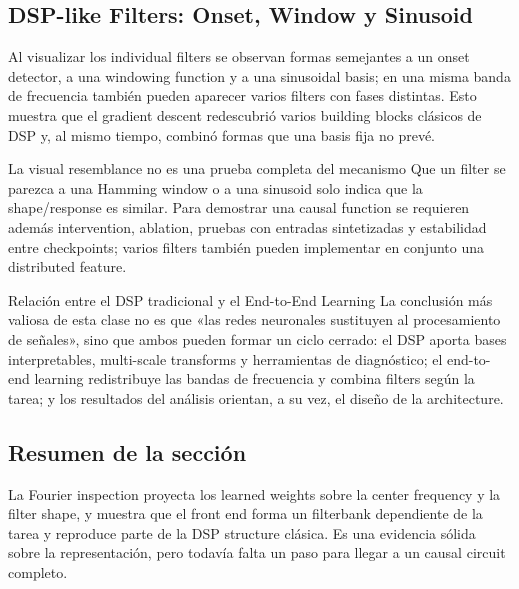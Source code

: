 
\subsection{DSP-like Filters: Onset, Window y Sinusoid}

Al visualizar los individual filters se observan formas semejantes a un onset detector, a una windowing function y a una sinusoidal basis; en una misma banda de frecuencia también pueden aparecer varios filters con fases distintas. Esto muestra que el gradient descent redescubrió varios building blocks clásicos de DSP y, al mismo tiempo, combinó formas que una basis fija no prevé.


\begin{warningbox}{La visual resemblance no es una prueba completa del mecanismo}
Que un filter se parezca a una Hamming window o a una sinusoid solo indica que la shape/response es similar. Para demostrar una causal function se requieren además intervention, ablation, pruebas con entradas sintetizadas y estabilidad entre checkpoints; varios filters también pueden implementar en conjunto una distributed feature.
\end{warningbox}

\begin{importantbox}{Relación entre el DSP tradicional y el End-to-End Learning}
La conclusión más valiosa de esta clase no es que «las redes neuronales sustituyen al procesamiento de señales», sino que ambos pueden formar un ciclo cerrado: el DSP aporta bases interpretables, multi-scale transforms y herramientas de diagnóstico; el end-to-end learning redistribuye las bandas de frecuencia y combina filters según la tarea; y los resultados del análisis orientan, a su vez, el diseño de la architecture.
\end{importantbox}

\subsection{Resumen de la sección}

La Fourier inspection proyecta los learned weights sobre la center frequency y la filter shape, y muestra que el front end forma un filterbank dependiente de la tarea y reproduce parte de la DSP structure clásica. Es una evidencia sólida sobre la representación, pero todavía falta un paso para llegar a un causal circuit completo.
